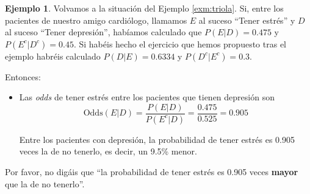 \documentclass[
]{book}
\theoremstyle{definition}
\theoremstyle{definition}
\newtheorem{example}{Ejemplo}[chapter]
\theoremstyle{definition}
\theoremstyle{definition}
\theoremstyle{remark}
\begin{document}
\begin{example}
\protect\hypertarget{exm:unnamed-chunk-131}{}\label{exm:unnamed-chunk-131}Volvamos a la situación del Ejemplo \ref{exm:triola}. Si, entre los pacientes de nuestro amigo cardiólogo, llamamos \(E\) al suceso ``Tener estrés'' y \(D\) al suceso ``Tener depresión'', habíamos calculado que \(P(E|D)=0.475\) y \(P(E^c|D^c)=0.45\). Si habéis hecho el ejercicio que hemos propuesto tras el ejemplo habréis calculado \(P(D|E)=0.6334\) y \(P(D^c|E^c)=0.3\).

Entonces:
\end{example}

\begin{itemize}
\item
  Las \emph{odds} de tener estrés entre los pacientes que tienen depresión son
  \[
  \text{Odds}(E|D)=\frac{P(E|D)}{P(E^c|D)}=\frac{0.475}{0.525}=0.905
  \]

  Entre los pacientes con depresión, la probabilidad de tener estrés es 0.905 veces la de no tenerlo, es decir, un 9.5\% menor.
\end{itemize}

\begin{rmdcaution}
Por favor, no digáis que ``la probabilidad de tener estrés es 0.905 veces \textbf{mayor} que la de no tenerlo''.
\end{rmdcaution}
\end{document}
